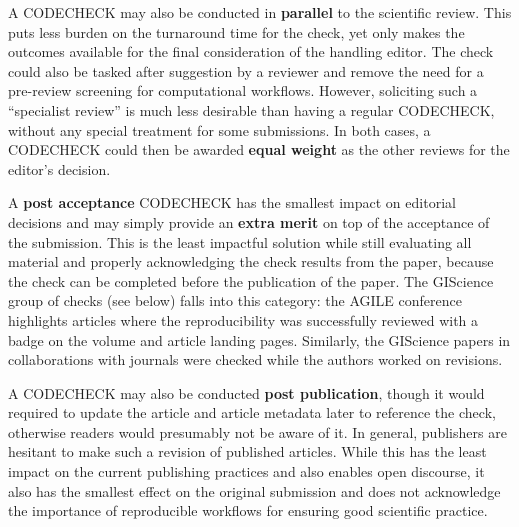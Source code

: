 \documentclass[12pt]{article}
\begin{document}
A CODECHECK may also be conducted in \textbf{parallel} to the scientific review.
This puts less burden on the turnaround time for the check, yet only makes the 
outcomes available for the final consideration of the handling editor.
The check could also be tasked after suggestion by a reviewer and remove the
need for a pre-review screening for computational workflows. However, 
soliciting such a ``specialist review'' is much less desirable than having
a regular CODECHECK, without any special treatment for some submissions.
In both cases, a CODECHECK could then be awarded \textbf{equal weight} as 
the other reviews for the editor's decision.

A \textbf{post acceptance} CODECHECK has the smallest impact on editorial 
decisions and may simply provide an \textbf{extra merit} on top of the 
acceptance of the submission. 
This  is the least impactful solution while still evaluating all material
and properly acknowledging the check results from the paper, because the 
check can be completed  before the publication of the paper.
The GIScience group of checks (see below) falls into this
category: the AGILE conference highlights articles where the reproducibility
was successfully reviewed with a badge on the volume and article landing
pages. Similarly, the GIScience papers in collaborations with journals were 
checked while the authors worked on revisions.

A CODECHECK may also be conducted \textbf{post publication}, though it
would required to update the article and article metadata later to reference 
the check, otherwise readers would presumably not be aware of it. In general,
publishers are hesitant to make such a revision of published articles.
While this has the least impact on the current publishing practices and also
enables open discourse,
it also has the smallest effect on the original submission
and does not acknowledge the importance of reproducible workflows for
ensuring good scientific practice.
\end{document}
